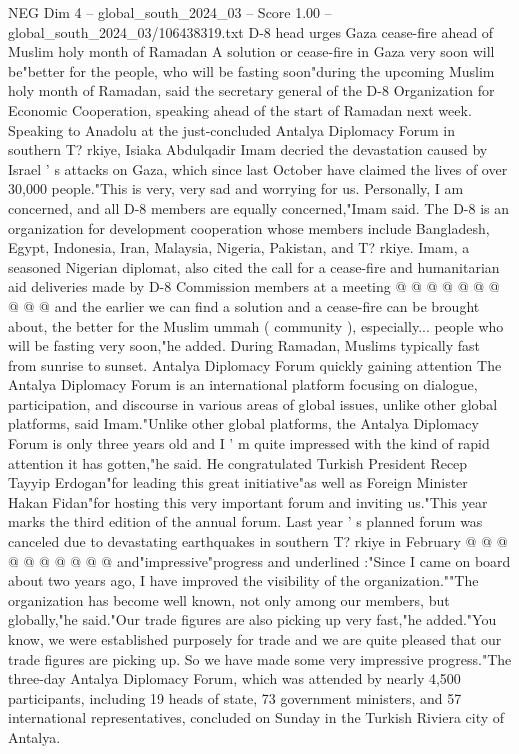 \begin{textsample}{NEG Dim 4 – global\_south\_2024\_03 – Score 1.00 – global\_south\_2024\_03/106438319.txt}  \label{ex:f4_neg_356}
D-8 head urges Gaza cease-fire ahead of Muslim holy month of Ramadan A solution or cease-fire in Gaza very soon will be"better for the people, who will be fasting soon"during the upcoming Muslim holy month of Ramadan, said the secretary general of the D-8 Organization for Economic Cooperation, speaking ahead of the start of Ramadan next week.
Speaking to Anadolu at the just-concluded Antalya Diplomacy Forum in southern T? rkiye, Isiaka Abdulqadir Imam decried the devastation caused by Israel ' s attacks on Gaza, which since last October have claimed the lives of over 30,000 people."This is very, very sad and worrying for us.
Personally, I am concerned, and all D-8 members are equally concerned,"Imam said.
The D-8 is an organization for development cooperation whose members include Bangladesh, Egypt, Indonesia, Iran, Malaysia, Nigeria, Pakistan, and T? rkiye.
Imam, a seasoned Nigerian diplomat, also cited the call for a cease-fire and humanitarian aid deliveries made by D-8 Commission members at a meeting @ @ @ @ @ @ @ @ @ @ and the earlier we can find a solution and a cease-fire can be brought about, the better for the Muslim ummah ( community ), especially... people who will be fasting very soon,"he added.
During Ramadan, Muslims typically fast from sunrise to sunset.
Antalya Diplomacy Forum quickly gaining attention The Antalya Diplomacy Forum is an international platform focusing on dialogue, participation, and discourse in various areas of global issues, unlike other global platforms, said Imam."Unlike other global platforms, the Antalya Diplomacy Forum is only three years old and I ' m quite impressed with the kind of rapid attention it has gotten,"he said.
He congratulated Turkish President Recep Tayyip Erdogan"for leading this great initiative"as well as Foreign Minister Hakan Fidan"for hosting this very important forum and inviting us."This year marks the third edition of the annual forum.
Last year ' s planned forum was canceled due to devastating earthquakes in southern T? rkiye in February @ @ @ @ @ @ @ @ @ @ and"impressive"progress and underlined :"Since I came on board about two years ago, I have improved the visibility of the organization.""The organization has become well known, not only among our members, but globally,"he said."Our trade figures are also picking up very fast,"he added."You know, we were established purposely for trade and we are quite pleased that our trade figures are picking up.
So we have made some very impressive progress."The three-day Antalya Diplomacy Forum, which was attended by nearly 4,500 participants, including 19 heads of state, 73 government ministers, and 57 international representatives, concluded on Sunday in the Turkish Riviera city of Antalya.

\end{textsample}
